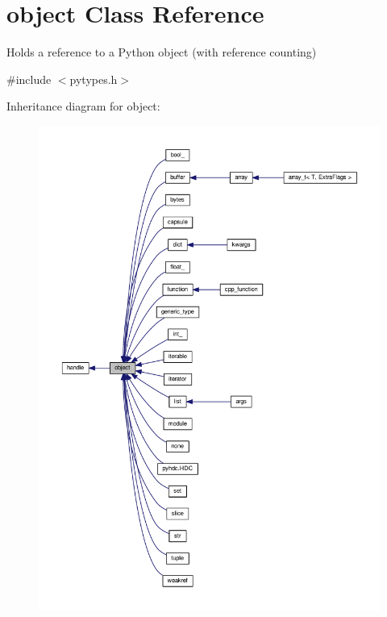 \hypertarget{classobject}{}\section{object Class Reference}
\label{classobject}


Holds a reference to a Python object (with reference counting)  




{\ttfamily \#include $<$pytypes.\+h$>$}



Inheritance diagram for object\+:
\nopagebreak
\begin{figure}[H]
\begin{center}
\leavevmode
\includegraphics[width=350pt]{classobject__inherit__graph}
\end{center}
\end{figure}


